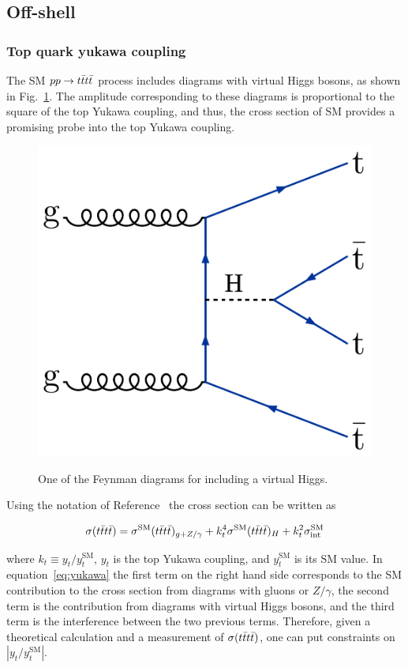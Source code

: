 \subsection{Off-shell}

\subsubsection{Top quark yukawa coupling}

The SM $pp \rightarrow t\bar{t}t\bar{t}$ process includes diagrams with virtual Higgs bosons,
as shown in Fig.~\ref{fig:feynYukawa}. 
The amplitude corresponding to these diagrams is 
proportional to the square of the top Yukawa coupling,
and thus, the cross section of SM \tttt provides
a promising probe into the top Yukawa coupling.

\begin{figure}[!hbtp]
\centering
\includegraphics[width=.35\textwidth]{figs/ftp/ftdiag3.pdf} \\
\caption{One of the Feynman diagrams for \tttt including a virtual Higgs.}
\label{fig:feynYukawa}
\end{figure}

Using the notation of Reference~\cite{THEORY:TopYukawaTTTT} the \tttt cross section can be written 
as 

\begin{equation} 
\label{eq:yukawa}
\sigma(t\bar{t}t\bar{t}) = \sigma^{\text{SM}}(t\bar{t}t\bar{t})_{g+Z/\gamma} + k_t^4 \sigma^{\text{SM}}(t\bar{t}t\bar{t})_H + k_t^2 \sigma^{\text{SM}}_{\rm int}
\end{equation} 

\noindent where $k_t \equiv y_t/y_t^{\text{SM}}$, $y_t$ is the top Yukawa coupling, and $y_t^{\text{SM}}$ is its SM value.
In equation~\ref{eq:yukawa} the first term on the right hand side corresponds to the 
SM contribution to the cross section from diagrams with gluons or $Z/\gamma$, the second term
is the contribution from diagrams with virtual Higgs bosons, and the third term is the interference between
the two previous terms. Therefore, given a theoretical calculation and a measurement of $\sigma(t\bar{t}t\bar{t})$, one can put 
constraints on $|y_t/y_t^{\text{SM}}|$.


